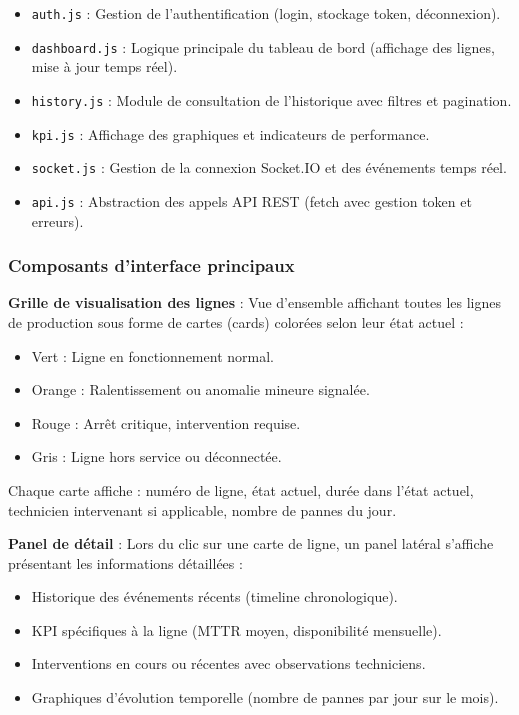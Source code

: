 \begin{itemize}
    \item \texttt{auth.js} : Gestion de l'authentification (login, stockage token, déconnexion).
    \item \texttt{dashboard.js} : Logique principale du tableau de bord (affichage des lignes, mise à jour temps réel).
    \item \texttt{history.js} : Module de consultation de l'historique avec filtres et pagination.
    \item \texttt{kpi.js} : Affichage des graphiques et indicateurs de performance.
    \item \texttt{socket.js} : Gestion de la connexion Socket.IO et des événements temps réel.
    \item \texttt{api.js} : Abstraction des appels API REST (fetch avec gestion token et erreurs).
\end{itemize}


\subsubsection{Composants d'interface principaux}

\textbf{Grille de visualisation des lignes} : Vue d'ensemble affichant toutes les lignes de production sous forme de cartes (cards) colorées selon leur état actuel :

\begin{itemize}
    \item Vert : Ligne en fonctionnement normal.
    \item Orange : Ralentissement ou anomalie mineure signalée.
    \item Rouge : Arrêt critique, intervention requise.
    \item Gris : Ligne hors service ou déconnectée.
\end{itemize}

Chaque carte affiche : numéro de ligne, état actuel, durée dans l'état actuel, technicien intervenant si applicable, nombre de pannes du jour.

\textbf{Panel de détail} : Lors du clic sur une carte de ligne, un panel latéral s'affiche présentant les informations détaillées :

\begin{itemize}
    \item Historique des événements récents (timeline chronologique).
    \item KPI spécifiques à la ligne (MTTR moyen, disponibilité mensuelle).
    \item Interventions en cours ou récentes avec observations techniciens.
    \item Graphiques d'évolution temporelle (nombre de pannes par jour sur le mois).
\end{itemize}

